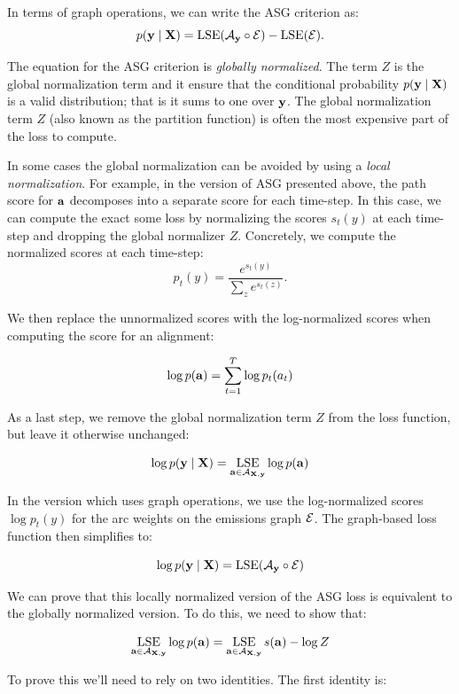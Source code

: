 In terms of graph operations, we can write the ASG criterion as:
\begin{equation}
    \label{eq:asg_graph_loss}
    p({\bf y} \mid {\bf X}) = \operatorname*{\textrm{LSE}}(\mathcal{A}_{\bf y} \circ \mathcal{E}) - \operatorname*{\textrm{LSE}}(\mathcal{E}).
\end{equation}

\begin{tcolorbox}[breakable, colback=white!95!black, colframe=white!45!black,
    sharp corners=all, title=Global or Local Normalization]
The equation for the ASG criterion is \emph{globally normalized}. The term $Z$
is the global normalization term and it ensure that the conditional probability
$p({\bf y} \mid {\bf X})$ is a valid distribution; that is it sums to one over ${\bf y}$.
The global normalization term $Z$ (also known as the partition function) is
often the most expensive part of the loss to compute.

In some cases the global normalization can be avoided by using a \emph{local
normalization}. For example, in the version of ASG presented above, the path
score for ${\bf a}$ decomposes into a separate score for each time-step. In this
case, we can compute the exact some loss by normalizing the scores $s_t(y)$ at
each time-step and dropping the global normalizer $Z$. Concretely, we compute
the normalized scores at each time-step:
$$
p_t(y) = \frac{e^{s_t(y)}}{\sum_z e^{s_t(z)}}.
$$

We then replace the unnormalized scores with the log-normalized scores when
computing the score for an alignment:

$$
\log p({\bf a}) = \sum_{t=1}^T \log p_t(a_t)
$$

As a last step, we remove the global normalization term $Z$ from the loss
function, but leave it otherwise unchanged:

$$
\log p({\bf y} \mid {\bf X}) = \operatorname*{\textrm{LSE}}_{{\bf a} \in \mathcal{A}_{{\bf X}, {\bf y}}} \log p({\bf a})
$$

In the version which uses graph operations, we use the log-normalized scores
$\log p_t(y)$ for the arc weights on the emissions graph $\mathcal{E}$. The graph-based
loss function then simplifies to:

$$
\log p({\bf y} \mid {\bf X}) = \operatorname*{\textrm{LSE}}(\mathcal{A}_{\bf y} \circ \mathcal{E})
$$

We can prove that this locally normalized version of the ASG loss is equivalent
to the globally normalized version. To do this, we need to show that:

$$
\operatorname*{\textrm{LSE}}_{{\bf a} \in \mathcal{A}_{{\bf X}, {\bf y}}} \log p({\bf a}) = \operatorname*{\textrm{LSE}}_{{\bf a} \in \mathcal{A}_{{\bf X}, {\bf y}}} s({\bf a}) - \log Z
$$

To prove this we'll need to rely on two identities. The first identity is:


\end{tcolorbox}

